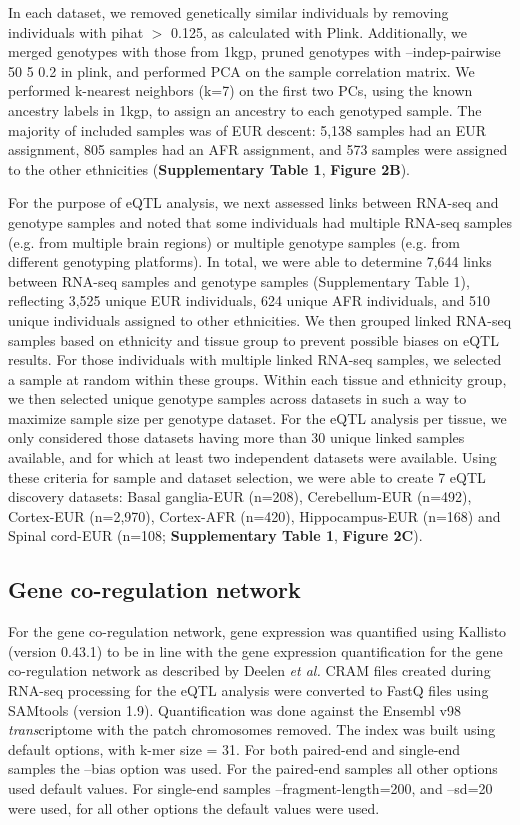 In each dataset, we removed genetically similar individuals by removing individuals with pihat $>$ 0.125, as calculated with Plink. Additionally, we merged genotypes with those from 1kgp, pruned genotypes with --indep-pairwise 50 5 0.2 in plink, and performed PCA on the sample correlation matrix. We performed k-nearest neighbors (k=7) on the first two PCs, using the known ancestry labels in 1kgp, to assign an ancestry to each genotyped sample. The majority of included samples was of EUR descent: 5,138 samples had an EUR assignment, 805 samples had an AFR assignment, and 573 samples were assigned to the other ethnicities (\textbf{Supplementary Table 1}, \textbf{Figure 2B}). 

For the purpose of eQTL analysis, we next assessed links between RNA-seq and genotype samples and noted that some individuals had multiple RNA-seq samples (e.g. from multiple brain regions) or multiple genotype samples (e.g. from different genotyping platforms). In total, we were able to determine 7,644 links between RNA-seq samples and genotype samples (Supplementary Table 1), reflecting 3,525 unique EUR individuals, 624 unique AFR individuals, and 510 unique individuals assigned to other ethnicities. We then grouped linked RNA-seq samples based on ethnicity and tissue group to prevent possible biases on eQTL results. For those individuals with multiple linked RNA-seq samples, we selected a sample at random within these groups. Within each tissue and ethnicity group, we then selected unique genotype samples across datasets in such a way to maximize sample size per genotype dataset. For the eQTL analysis per tissue, we only considered those datasets having more than 30 unique linked samples available, and for which at least two independent datasets were available. Using these criteria for sample and dataset selection, we were able to create 7 eQTL discovery datasets: Basal ganglia-EUR (n=208), Cerebellum-EUR (n=492), Cortex-EUR (n=2,970), Cortex-AFR (n=420), Hippocampus-EUR (n=168) and Spinal cord-EUR (n=108; \textbf{Supplementary Table 1}, \textbf{Figure 2C}). 

\subsection{Gene co-regulation network}
For the gene co-regulation network, gene expression was quantified using Kallisto\cite{brayNearoptimalProbabilisticRNAseq2016} (version 0.43.1) to be in line with the gene expression quantification for the gene co-regulation network as described by Deelen \emph{et al.}\cite{deelenImprovingDiagnosticYield2019}  CRAM files created during RNA-seq processing for the eQTL analysis were converted to FastQ files using SAMtools\cite{liSequenceAlignmentMap2009} (version 1.9). Quantification was done against the Ensembl\cite{cunninghamEnsembl20192019} v98 \emph{trans}criptome with the patch chromosomes removed. The index was built using default options, with k-mer size = 31. For both paired-end and single-end samples the –bias option was used. For the paired-end samples all other options used default values. For single-end samples –fragment-length=200, and –sd=20 were used, for all other options the default values were used. 

